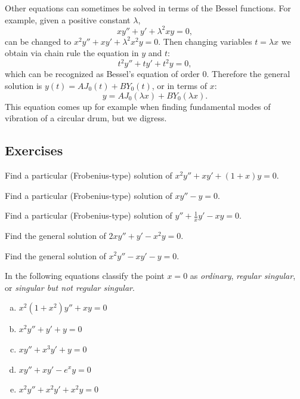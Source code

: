 \documentclass[12pt]{book}
\begin{document}
\begin{example}
Other equations can sometimes be solved in terms of the Bessel functions.
For example, given a positive constant $\lambda$,
\begin{equation*}
x y'' + y' + \lambda^2 x y = 0 ,
\end{equation*}
can be changed to 
$x^2 y'' + x y' + \lambda^2 x^2 y = 0$.  Then changing variables
$t = \lambda x$ we obtain via chain rule the equation in $y$ and $t$:
\begin{equation*}
t^2 y'' + t y' + t^2 y = 0 ,
\end{equation*}
which can be recognized as Bessel's equation of order 0.  Therefore the
general solution is $y(t) = A J_0(t) + B Y_0(t)$, or in terms of $x$:
\begin{equation*}
y = A J_0(\lambda x) + B Y_0(\lambda x) .
\end{equation*}
This equation comes up for example when finding fundamental modes of
vibration of a circular drum, but we digress.
\end{example}

\subsection{Exercises}

\begin{exercise}
Find a particular (Frobenius-type) solution of $x^2 y'' + x y' + (1+x) y = 0$.
\end{exercise}

\begin{exercise}
Find a particular (Frobenius-type) solution of $x y'' - y = 0$.
\end{exercise}

\begin{exercise}
Find a particular (Frobenius-type) solution of $y'' +\frac{1}{x}y' - xy = 0$.
\end{exercise}

\begin{exercise}
Find the general solution of $2 x y'' + y' - x^2 y = 0$.
\end{exercise}

\begin{exercise}
Find the general solution of $x^2 y'' - x y' -y = 0$.
\end{exercise}

\begin{exercise}
In the following equations
classify the point $x=0$ as \emph{ordinary}, \emph{regular singular}, or
\emph{singular but not regular singular}.
\begin{enumerate}[a)]
\item $x^2(1+x^2)y''+xy=0$
\item $x^2y''+y'+y=0$
\item $xy''+x^3y'+y=0$
\item $xy''+xy'-e^xy=0$
\item $x^2y''+x^2y'+x^2y=0$
\end{enumerate}
\end{exercise}
\end{document}
